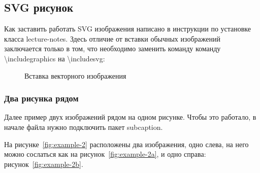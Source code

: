 \documentclass[russian]{lecture-notes}
\begin{document}
\subsection{SVG рисунок}

Как заставить работать SVG изображения написано в инструкции по установке класса
lecture-notes.
Здесь отличие от вставки обычных изображений заключается только в том, что
необходимо заменить команду команду \textbackslash includegraphics на
\textbackslash includesvg:

\begin{figure}[htb]
    \centering
    
    \caption{Вставка векторного изображения}
    \label{fig:svg-example}
\end{figure}


\subsubsection{Два рисунка рядом}

Далее пример двух изображений рядом на одном рисунке.
Чтобы это работало, в начале файла нужно подключить пакет subcaption.

На рисунке~\ref{fig:example-2} расположены два изображения, одно слева, на него можно сослаться
как на рисунок~\ref{fig:example-2a}, и одно справа: рисунок~\ref{fig:example-2b}.
\end{document}

